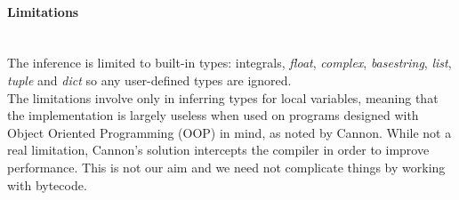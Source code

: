 \documentclass[12pt, titlepage]{article}
\begin{document}
\paragraph{Limitations}\mbox{}\\
The inference is limited to built-in types: integrals, \textit{float}, \textit{complex}, \textit{basestring}, \textit{list}, \textit{tuple} and \textit{dict} so any user-defined types are ignored. \\
The limitations involve only in inferring types for local variables, meaning that the implementation is largely useless when used on programs designed with Object Oriented Programming (OOP) in mind, as noted by Cannon. While not a real limitation, Cannon's solution intercepts the compiler in order to improve performance. This is not our aim and we need not complicate things by working with bytecode.

\end{document}

